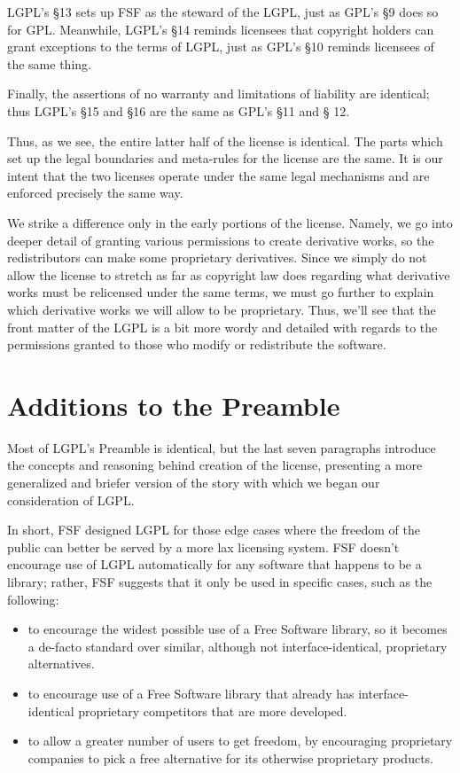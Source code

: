 \documentclass[12pt]{report}
\begin{document}
LGPL's \S 13 sets up FSF as the steward of the LGPL, just as GPL's \S 9
does so for GPL.  Meanwhile, LGPL's \S 14 reminds licensees that copyright
holders can grant exceptions to the terms of LGPL, just as GPL's \S 10
reminds licensees of the same thing.

Finally, the assertions of no warranty and limitations of liability are
identical; thus LGPL's \S 15 and \S 16 are the same as GPL's \S 11 and \S
12.

Thus, as we see, the entire latter half of the license is identical.
The parts which set up the legal boundaries and meta-rules for the license
are the same.  It is our intent that the two licenses operate under the
same legal mechanisms and are enforced precisely the same way.

We strike a difference only in the early portions of the license.
Namely, we go into deeper detail of granting various permissions to
create derivative works, so the redistributors can make some proprietary
derivatives.  Since we simply do not allow the license to stretch as far
as copyright law does regarding what derivative works must be relicensed
under the same terms, we must go further to explain which derivative works
we will allow to be proprietary.  Thus, we'll see that the front matter
of the LGPL is a bit more wordy and detailed with regards to the
permissions granted to those who modify or redistribute the software.

\section{Additions to the Preamble}

Most of LGPL's Preamble is identical, but the last seven paragraphs
introduce the concepts and reasoning behind creation of the license,
presenting a more generalized and briefer version of the story with which
we began our consideration of LGPL\@.

In short, FSF designed LGPL for those edge cases where the freedom of the
public can better be served by a more lax licensing system.  FSF doesn't
encourage use of LGPL automatically for any software that happens to be a
library; rather, FSF suggests that it only be used in specific cases, such
as the following:

\begin{itemize}

\item to encourage the widest possible use of a Free Software library, so
  it becomes a de-facto standard over similar, although not
  interface-identical, proprietary alternatives.

\item to encourage use of a Free Software library that already has
  interface-identical proprietary competitors that are more developed.

\item to allow a greater number of users to get freedom, by encouraging
  proprietary companies to pick a free alternative for its otherwise
  proprietary products.

\end{itemize}
\end{document}
